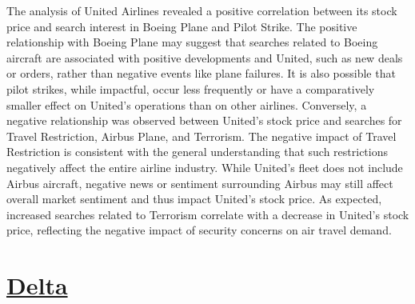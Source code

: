 \documentclass[12pt]{report}
\begin{document}
The analysis of United Airlines revealed a positive
correlation between its stock price and search interest in Boeing
Plane and Pilot Strike. The positive relationship with
Boeing Plane may suggest that searches related to Boeing aircraft
are associated with positive developments and United, such as new deals or
orders, rather than negative events like plane failures.
It is also possible that pilot strikes, while impactful, occur less frequently or have a
comparatively smaller effect on United's operations than on other airlines.
Conversely, a negative relationship was observed between United's stock price
and searches for Travel Restriction, Airbus Plane,
and Terrorism. The negative impact of Travel
Restriction is consistent with the general understanding that such
restrictions negatively affect the entire airline industry.
While United's fleet does not include Airbus aircraft, negative news or sentiment surrounding
Airbus may still affect overall market sentiment and thus impact United's stock
price.
As expected, increased searches related to Terrorism correlate with a decrease in United's stock price, reflecting the negative impact of security concerns on air travel demand.





\newpage
\section*{\underline{Delta}}
\end{document}
